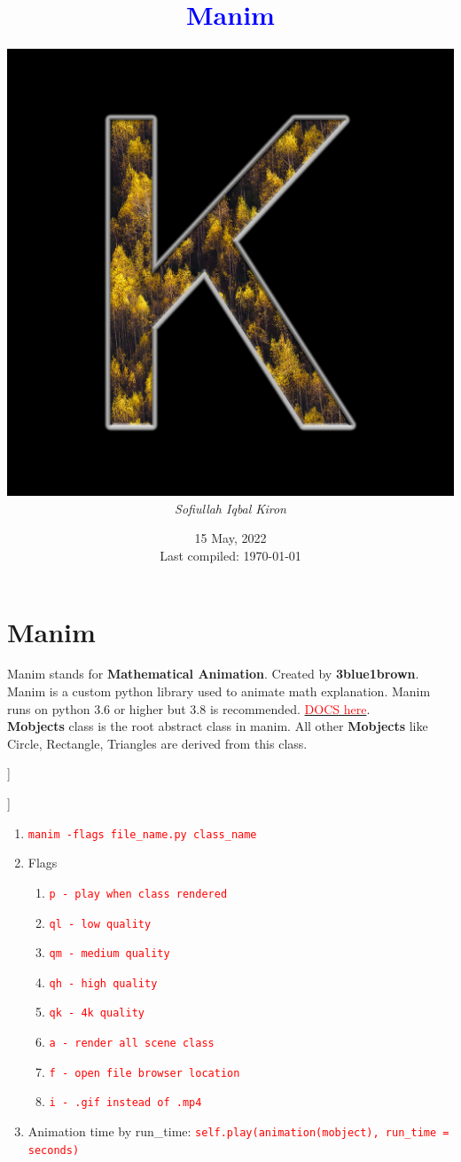 \documentclass[12 pt, letterpaper]{extarticle}
\title{\textcolor{blue}{Manim}}
\author
{
	\includegraphics[scale=0.2]{../Commands/User Profile} \\ %
	\textit{Sofiullah Iqbal Kiron} \\
	\R{\rule{11 cm}{2 pt}}
}
\date{15 May, 2022 \\ {\tiny Last compiled: \today}}
\newcommand{\R}{\textcolor{red}} %
\newcommand{\T}{\texttt}
\begin{document}
	
	\maketitle
	
	\section*{Manim}
	Manim stands for \textbf{Mathematical Animation}. Created by \textbf{3blue1brown}. Manim is a custom python library used to animate math explanation. Manim runs on python 3.6 or higher but 3.8 is recommended. \href{https://docs.manim.community/en/stable/}{\textcolor{red}{DOCS here}}.\\
	\textbf{Mobjects} class is the root abstract class in manim. All other \textbf{Mobjects} like Circle, Rectangle, Triangles are derived from this class.\\
	
	\begin{center}
		\begin{forest}
			[Mobject
				[frame]
				[geometry]
				[graph]
				[graphing]
				[logo]
				[matrix]
				[mobjects]
				[svg]
				[table]
				[text]
				[three\_d]
				[types]
				[value\_tracker]
				[vector\_field]
			]
		\end{forest}
	\end{center}

	\begin{center}
		\begin{forest}
			[geometry
				[arc]
				[boolean\_ops]
				[line]
				[polygram]
				[shape\_matchers]
				[tips]
			]
		\end{forest}
	\end{center}
	
	\begin{enumerate}
		\item \R{\T{manim -flags file\_name.py class\_name}}
		\item Flags
		\begin{enumerate}
			\item \R{\T{p - play when class rendered}}
			\item \R{\T{ql - low quality}}
			\item \R{\T{qm - medium quality}}
			\item \R{\T{qh - high quality}}
			\item \R{\T{qk - 4k quality}}
			\item \R{\T{a - render all scene class}}
			\item \R{\T{f - open file browser location}}
			\item \R{\T{i - .gif instead of .mp4}}
		\end{enumerate}
		\item Animation time by run\_time: \R{\T{self.play(animation(mobject), run\_time = seconds)}}
	\end{enumerate}
\end{document}
